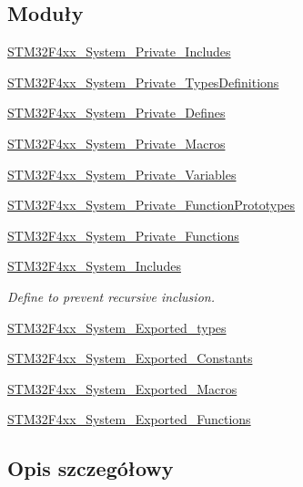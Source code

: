 \subsection*{Moduły}
\begin{DoxyCompactItemize}
\item 
\hyperlink{group___s_t_m32_f4xx___system___private___includes}{S\+T\+M32\+F4xx\+\_\+\+System\+\_\+\+Private\+\_\+\+Includes}
\item 
\hyperlink{group___s_t_m32_f4xx___system___private___types_definitions}{S\+T\+M32\+F4xx\+\_\+\+System\+\_\+\+Private\+\_\+\+Types\+Definitions}
\item 
\hyperlink{group___s_t_m32_f4xx___system___private___defines}{S\+T\+M32\+F4xx\+\_\+\+System\+\_\+\+Private\+\_\+\+Defines}
\item 
\hyperlink{group___s_t_m32_f4xx___system___private___macros}{S\+T\+M32\+F4xx\+\_\+\+System\+\_\+\+Private\+\_\+\+Macros}
\item 
\hyperlink{group___s_t_m32_f4xx___system___private___variables}{S\+T\+M32\+F4xx\+\_\+\+System\+\_\+\+Private\+\_\+\+Variables}
\item 
\hyperlink{group___s_t_m32_f4xx___system___private___function_prototypes}{S\+T\+M32\+F4xx\+\_\+\+System\+\_\+\+Private\+\_\+\+Function\+Prototypes}
\item 
\hyperlink{group___s_t_m32_f4xx___system___private___functions}{S\+T\+M32\+F4xx\+\_\+\+System\+\_\+\+Private\+\_\+\+Functions}
\item 
\hyperlink{group___s_t_m32_f4xx___system___includes}{S\+T\+M32\+F4xx\+\_\+\+System\+\_\+\+Includes}
\begin{DoxyCompactList}\small\item\em Define to prevent recursive inclusion. \end{DoxyCompactList}\item 
\hyperlink{group___s_t_m32_f4xx___system___exported__types}{S\+T\+M32\+F4xx\+\_\+\+System\+\_\+\+Exported\+\_\+types}
\item 
\hyperlink{group___s_t_m32_f4xx___system___exported___constants}{S\+T\+M32\+F4xx\+\_\+\+System\+\_\+\+Exported\+\_\+\+Constants}
\item 
\hyperlink{group___s_t_m32_f4xx___system___exported___macros}{S\+T\+M32\+F4xx\+\_\+\+System\+\_\+\+Exported\+\_\+\+Macros}
\item 
\hyperlink{group___s_t_m32_f4xx___system___exported___functions}{S\+T\+M32\+F4xx\+\_\+\+System\+\_\+\+Exported\+\_\+\+Functions}
\end{DoxyCompactItemize}


\subsection{Opis szczegółowy}
